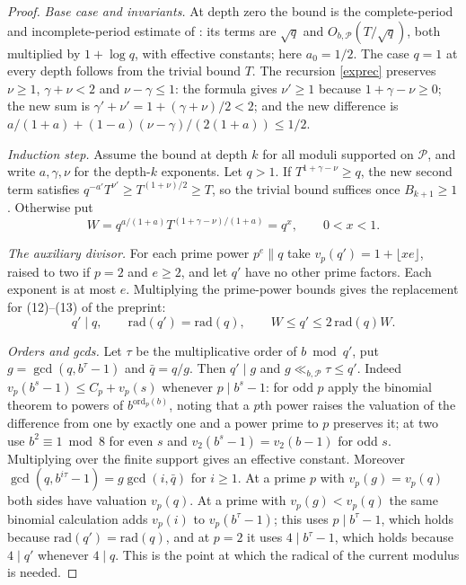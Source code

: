 \documentclass[11pt]{article}
\begin{document}
\begin{proof}
\emph{Base case and invariants.} At depth zero the bound is the
complete-period and incomplete-period estimate of
\cite[preprint, Lemma~2.3, eq.~(7)]{vandehey}: its terms are \(\sqrt q\) and
\(O_{b,\mathcal P}(T/\sqrt q)\), both multiplied by \(1+\log q\), with
effective constants; here \(a_0=1/2\). The case \(q=1\) at every depth
follows from the trivial bound \(T\). The recursion \eqref{exprec}
preserves \(\nu\ge1\), \(\gamma+\nu<2\) and \(\nu-\gamma\le1\): the formula
gives \(\nu'\ge1\) because \(1+\gamma-\nu\ge0\); the new sum is
\(\gamma'+\nu'=1+(\gamma+\nu)/2<2\); and the new difference is
\(a/(1+a)+(1-a)(\nu-\gamma)/(2(1+a))\le1/2\).

\emph{Induction step.} Assume the bound at depth \(k\) for all moduli
supported on \(\mathcal P\), and write \(a,\gamma,\nu\) for the depth-\(k\)
exponents. Let \(q>1\). If \(T^{1+\gamma-\nu}\ge q\), the new second term
satisfies \(q^{-a'}T^{\nu'}\ge T^{(1+\nu)/2}\ge T\), so the trivial bound
suffices once \(B_{k+1}\ge1\). Otherwise put
\[
 W=q^{a/(1+a)}T^{(1+\gamma-\nu)/(1+a)}=q^x,\qquad 0<x<1.
\]

\emph{The auxiliary divisor.} For each prime power \(p^e\parallel q\) take
\(v_p(q')=1+\lfloor xe\rfloor\), raised to two if \(p=2\) and \(e\ge2\),
and let \(q'\) have no other prime factors. Each exponent is at most
\(e\). Multiplying the prime-power bounds gives the replacement for
(12)--(13) of the preprint:
\[
 q'\mid q,\qquad \mathrm{rad}(q')=\mathrm{rad}(q),\qquad
 W\le q'\le 2\,\mathrm{rad}(q) W.
\]

\emph{Orders and gcds.} Let \(\tau\) be the multiplicative order of
\(b\bmod q'\), put \(g=\gcd(q,b^\tau-1)\) and \(\bar q=q/g\). Then
\(q'\mid g\) and \(g\ll_{b,\mathcal P}\tau\le q'\). Indeed
\(v_p(b^s-1)\le C_p+v_p(s)\) whenever \(p\mid b^s-1\): for odd \(p\) apply
the binomial theorem to powers of \(b^{\mathrm{ord}_p(b)}\), noting that a
\(p\)th power raises the valuation of the difference from one by exactly
one and a power prime to \(p\) preserves it; at two use
\(b^2\equiv1\bmod8\) for even \(s\) and \(v_2(b^s-1)=v_2(b-1)\) for odd
\(s\). Multiplying over the finite support gives an effective constant.
Moreover \(\gcd(q,b^{i\tau}-1)=g\gcd(i,\bar q)\) for \(i\ge1\). At a prime
\(p\) with \(v_p(g)=v_p(q)\) both sides have valuation \(v_p(q)\). At a
prime with \(v_p(g)<v_p(q)\) the same binomial calculation adds
\(v_p(i)\) to \(v_p(b^\tau-1)\); this uses \(p\mid b^\tau-1\), which holds
because \(\mathrm{rad}(q')=\mathrm{rad}(q)\), and at \(p=2\) it uses
\(4\mid b^\tau-1\), which holds because \(4\mid q'\) whenever \(4\mid q\).
This is the point at which the radical of the current modulus is needed.


\end{proof}
\end{document}
